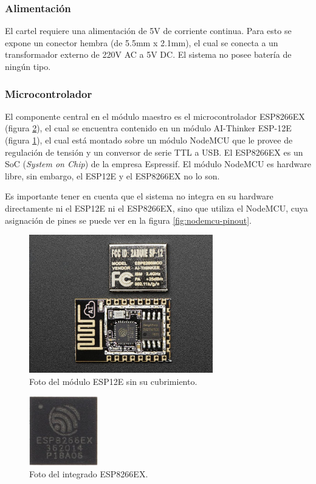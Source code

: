\subsubsection{Alimentación} \label{sec:alimentacion}
El cartel requiere una alimentación de 5V de corriente continua. Para esto se expone un conector hembra (de 5.5mm x 2.1mm), el cual se conecta a un transformador externo de 220V AC a 5V DC. El sistema no posee batería de ningún tipo.

\subsubsection{Microcontrolador} \label{sec:microcontrolador}
El componente central en el módulo maestro es el microcontrolador ESP8266EX (figura \ref{fig:esp8266ex}), el cual se encuentra contenido en un módulo AI-Thinker ESP-12E (figura \ref{fig:foto-esp12e}), el cual está montado sobre un módulo NodeMCU que le provee de regulación de tensión y un conversor de serie TTL a USB. El ESP8266EX es un SoC (\emph{System on Chip}) de la empresa Espressif. El módulo NodeMCU es hardware libre, sin embargo, el ESP12E y el ESP8266EX no lo son.\cite{NodeMCU}

Es importante tener en cuenta que el sistema no integra en su hardware directamente ni el ESP12E ni el ESP8266EX, sino que utiliza el NodeMCU, cuya asignación de pines se puede ver en la figura \ref{fig:nodemcu-pinout}.

\begin{figure}[ht!]
	\begin{center}
		\includegraphics[width=8cm]{imagenes/esp12e-foto.jpg}
		\caption{Foto del módulo ESP12E sin su cubrimiento.}
		\label{fig:foto-esp12e}
	\end{center}
\end{figure}

\begin{figure}[ht!]
	\begin{center}
		\includegraphics[width=3cm]{imagenes/esp8266ex.jpg}
		\caption{Foto del integrado ESP8266EX.}
		\label{fig:esp8266ex}
	\end{center}
\end{figure}


